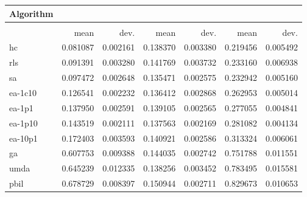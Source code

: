 \begin{tabular}{@{} l *{6}{>{{}}N{1}{2}} @{}}
\toprule
{Algorithm} &  \\
\midrule
&  &  &  \\
\midrule
& {mean} & {dev.} & {mean} & {dev.} & {mean} & {dev.} \\
\midrule
hc & 0.081087 & 0.002161 & 0.138370 & 0.003380 & 0.219456 & 0.005492 \\
rls & 0.091391 & 0.003280 & 0.141769 & 0.003732 & 0.233160 & 0.006938 \\
sa & 0.097472 & 0.002648 & 0.135471 & 0.002575 & 0.232942 & 0.005160 \\
ea-1c10 & 0.126541 & 0.002232 & 0.136412 & 0.002868 & 0.262953 & 0.005014 \\
ea-1p1 & 0.137950 & 0.002591 & 0.139105 & 0.002565 & 0.277055 & 0.004841 \\
ea-1p10 & 0.143519 & 0.002111 & 0.137563 & 0.002169 & 0.281082 & 0.004134 \\
ea-10p1 & 0.172403 & 0.003593 & 0.140921 & 0.002586 & 0.313324 & 0.006061 \\
ga & 0.607753 & 0.009388 & 0.144035 & 0.002742 & 0.751788 & 0.011551 \\
umda & 0.645239 & 0.012335 & 0.138256 & 0.003452 & 0.783495 & 0.015581 \\
pbil & 0.678729 & 0.008397 & 0.150944 & 0.002711 & 0.829673 & 0.010653 \\
\bottomrule
\end{tabular}
